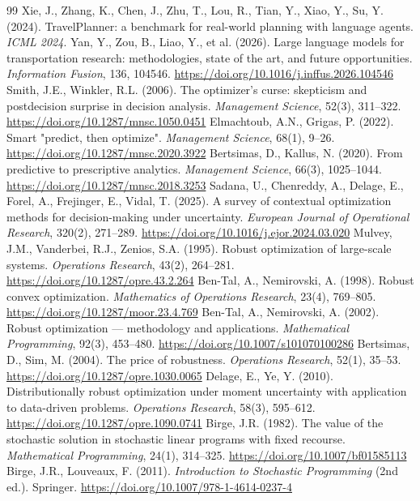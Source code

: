 \documentclass[preprint,12pt,letterpaper]{elsarticle}
\theoremstyle{definition}
\theoremstyle{plain}
\begin{document}
\begin{thebibliography}{99}
 Xie, J., Zhang, K., Chen, J., Zhu, T., Lou, R., Tian, Y., Xiao, Y., Su, Y. (2024). TravelPlanner: a benchmark for real-world planning with language agents. \textit{ICML 2024}.
 Yan, Y., Zou, B., Liao, Y., et al. (2026). Large language models for transportation research: methodologies, state of the art, and future opportunities. \textit{Information Fusion}, 136, 104546. \url{https://doi.org/10.1016/j.inffus.2026.104546}
 Smith, J.E., Winkler, R.L. (2006). The optimizer's curse: skepticism and postdecision surprise in decision analysis. \textit{Management Science}, 52(3), 311--322. \url{https://doi.org/10.1287/mnsc.1050.0451}
 Elmachtoub, A.N., Grigas, P. (2022). Smart "predict, then optimize". \textit{Management Science}, 68(1), 9--26. \url{https://doi.org/10.1287/mnsc.2020.3922}
 Bertsimas, D., Kallus, N. (2020). From predictive to prescriptive analytics. \textit{Management Science}, 66(3), 1025--1044. \url{https://doi.org/10.1287/mnsc.2018.3253}
 Sadana, U., Chenreddy, A., Delage, E., Forel, A., Frejinger, E., Vidal, T. (2025). A survey of contextual optimization methods for decision-making under uncertainty. \textit{European Journal of Operational Research}, 320(2), 271--289. \url{https://doi.org/10.1016/j.ejor.2024.03.020}
 Mulvey, J.M., Vanderbei, R.J., Zenios, S.A. (1995). Robust optimization of large-scale systems. \textit{Operations Research}, 43(2), 264--281. \url{https://doi.org/10.1287/opre.43.2.264}
 Ben-Tal, A., Nemirovski, A. (1998). Robust convex optimization. \textit{Mathematics of Operations Research}, 23(4), 769--805. \url{https://doi.org/10.1287/moor.23.4.769}
 Ben-Tal, A., Nemirovski, A. (2002). Robust optimization --- methodology and applications. \textit{Mathematical Programming}, 92(3), 453--480. \url{https://doi.org/10.1007/s101070100286}
 Bertsimas, D., Sim, M. (2004). The price of robustness. \textit{Operations Research}, 52(1), 35--53. \url{https://doi.org/10.1287/opre.1030.0065}
 Delage, E., Ye, Y. (2010). Distributionally robust optimization under moment uncertainty with application to data-driven problems. \textit{Operations Research}, 58(3), 595--612. \url{https://doi.org/10.1287/opre.1090.0741}
 Birge, J.R. (1982). The value of the stochastic solution in stochastic linear programs with fixed recourse. \textit{Mathematical Programming}, 24(1), 314--325. \url{https://doi.org/10.1007/bf01585113}
 Birge, J.R., Louveaux, F. (2011). \textit{Introduction to Stochastic Programming} (2nd ed.). Springer. \url{https://doi.org/10.1007/978-1-4614-0237-4}

\end{thebibliography}
\end{document}
